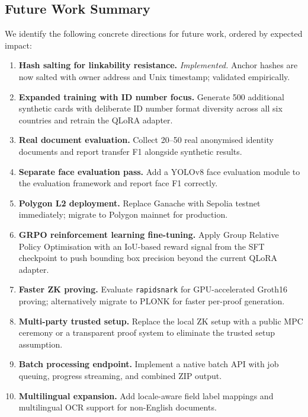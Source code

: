 \documentclass[conference]{IEEEtran}
\begin{document}
\subsection{Future Work Summary}

We identify the following concrete directions for
future work, ordered by expected impact:

\begin{enumerate}

  \item \textbf{Hash salting for linkability resistance.}
  \emph{Implemented.} Anchor hashes are now salted with
  owner address and Unix timestamp; validated empirically.

  \item \textbf{Expanded training with ID number focus.}
  Generate 500 additional synthetic cards with
  deliberate ID number format diversity across all
  six countries and retrain the QLoRA adapter.

  \item \textbf{Real document evaluation.}
  Collect 20--50 real anonymised identity documents
  and report transfer F1 alongside synthetic results.

  \item \textbf{Separate face evaluation pass.}
  Add a YOLOv8 face evaluation module to the
  evaluation framework and report face F1 correctly.

  \item \textbf{Polygon L2 deployment.}
  Replace Ganache with Sepolia testnet immediately;
  migrate to Polygon mainnet for production.

  \item \textbf{GRPO reinforcement learning fine-tuning.}
  Apply Group Relative Policy Optimisation with an
  IoU-based reward signal from the SFT checkpoint
  to push bounding box precision beyond the current
  QLoRA adapter.

  \item \textbf{Faster ZK proving.}
  Evaluate \texttt{rapidsnark} for GPU-accelerated
  Groth16 proving; alternatively migrate to PLONK
  for faster per-proof generation.

  \item \textbf{Multi-party trusted setup.}
  Replace the local ZK setup with a public MPC
  ceremony or a transparent proof system to eliminate
  the trusted setup assumption.

  \item \textbf{Batch processing endpoint.}
  Implement a native batch API with job queuing,
  progress streaming, and combined ZIP output.

  \item \textbf{Multilingual expansion.}
  Add locale-aware field label mappings and
  multilingual OCR support for non-English documents.

\end{enumerate}
\end{document}
